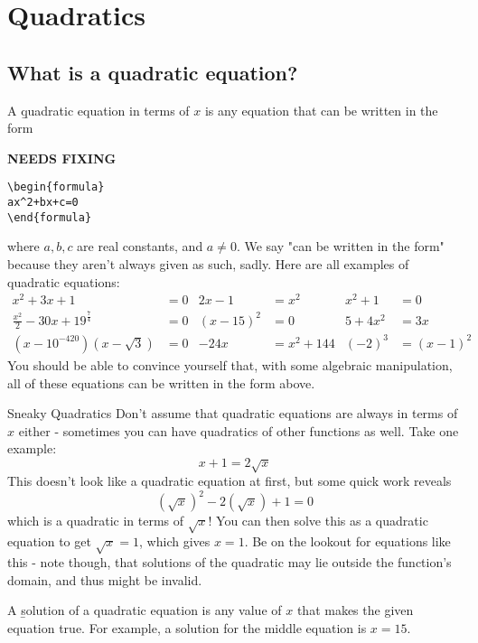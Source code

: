 \documentclass[../../main.tex]{subfiles}
\begin{document}
\chapter{Quadratics}

\section{What is a quadratic equation?}
A \b{quadratic equation} in terms of $x$ is any equation that can be written in the form 

{\hfill\Large\bfseries NEEDS FIXING\hfill}
\begin{lstlisting}
\begin{formula}
ax^2+bx+c=0
\end{formula}
 \end{lstlisting}
where $a,b,c$ are real constants, and $a\neq0$. We say "can be written in the form" because they aren't always given as such, sadly. Here are all examples of quadratic equations:
\begin{align}
    x^2+3x+1&=0 & 2x-1&=x^2 & x^2 + 1 &= 0 \\
    \frac{x^2}{2}-30x+19^{\frac74}&=0  & (x-15)^2&=0  & 5+4x^2&=3x \\
    (x-10^{-420})(x-\sqrt{3})&=0 & -24x&=x^2+144 & (-2)^3&=(x-1)^2
\end{align}
You should be able to convince yourself that, with some algebraic manipulation, all of these equations can be written in the form above.

\begin{insight}{Sneaky Quadratics}
Don't assume that quadratic equations are always in terms of $x$ either - sometimes you can have quadratics of other functions as well. Take one example: $$x+1=2\sqrt{x}$$ This doesn't look like a quadratic equation at first, but some quick work reveals $$(\sqrt{x})^2-2(\sqrt{x})+1=0$$ which is a quadratic in terms of $\sqrt{x}$! You can then solve this as a quadratic equation to get $\sqrt{x}=1$, which gives $x=1$. Be on the lookout for equations like this - note though, that solutions of the quadratic may lie outside the function's domain, and thus might be invalid.
\end{insight}


A \b{solution} of a quadratic equation is any value of $x$ that makes the given equation true. For example, a solution for the middle equation is $x=15$.
\end{document}
